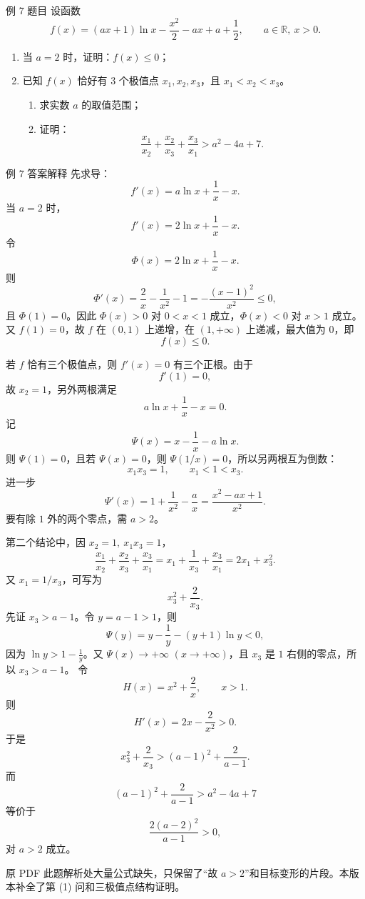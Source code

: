 ﻿\documentclass[aspectratio=169,10pt]{ctexbeamer}
\newcommand{\R}{\mathbb R}
\newcommand{\auditnote}[1]{\par\medskip{\color{Warn}\bfseries 原答案疏漏/补充：}#1}
\begin{document}
\begin{frame}{例 7 题目}
\small
设函数
\[
f(x)=(ax+1)\ln x-\frac{x^2}{2}-ax+a+\frac12,\qquad a\in\R,\ x>0.
\]
\begin{enumerate}
  \item 当 $a=2$ 时，证明：$f(x)\le0$；
  \item 已知 $f(x)$ 恰好有 $3$ 个极值点 $x_1,x_2,x_3$，且 $x_1<x_2<x_3$。
  \begin{enumerate}
    \item 求实数 $a$ 的取值范围；
    \item 证明：
    \[
    \frac{x_1}{x_2}+\frac{x_2}{x_3}+\frac{x_3}{x_1}>a^2-4a+7.
    \]
  \end{enumerate}
\end{enumerate}
\end{frame}

\begin{frame}[allowframebreaks]{例 7 答案解释}
\small
先求导：
\[
f'(x)=a\ln x+\frac1x-x.
\]
当 $a=2$ 时，
\[
f'(x)=2\ln x+\frac1x-x.
\]
令
\[
\Phi(x)=2\ln x+\frac1x-x.
\]
则
\[
\Phi'(x)=\frac2x-\frac1{x^2}-1=-\frac{(x-1)^2}{x^2}\le0,
\]
且 $\Phi(1)=0$。因此 $\Phi(x)>0$ 对 $0<x<1$ 成立，$\Phi(x)<0$ 对 $x>1$ 成立。
又 $f(1)=0$，故 $f$ 在 $(0,1)$ 上递增，在 $(1,+\infty)$ 上递减，最大值为 $0$，即
\[
f(x)\le0.
\]

\framebreak

若 $f$ 恰有三个极值点，则 $f'(x)=0$ 有三个正根。由于
\[
f'(1)=0,
\]
故 $x_2=1$，另外两根满足
\[
a\ln x+\frac1x-x=0.
\]
记
\[
\Psi(x)=x-\frac1x-a\ln x.
\]
则 $\Psi(1)=0$，且若 $\Psi(x)=0$，则 $\Psi(1/x)=0$，所以另两根互为倒数：
\[
x_1x_3=1,\qquad x_1<1<x_3.
\]
进一步
\[
\Psi'(x)=1+\frac1{x^2}-\frac ax=\frac{x^2-ax+1}{x^2}.
\]
要有除 $1$ 外的两个零点，需 $a>2$。

\framebreak

第二个结论中，因 $x_2=1,\ x_1x_3=1$，
\[
\frac{x_1}{x_2}+\frac{x_2}{x_3}+\frac{x_3}{x_1}
=x_1+\frac1{x_3}+\frac{x_3}{x_1}
=2x_1+x_3^2.
\]
又 $x_1=1/x_3$，可写为
\[
x_3^2+\frac2{x_3}.
\]
先证 $x_3>a-1$。令 $y=a-1>1$，则
\[
\Psi(y)=y-\frac1y-(y+1)\ln y<0,
\]
因为 $\ln y>1-\frac1y$。又 $\Psi(x)\to+\infty$ $(x\to+\infty)$，且 $x_3$ 是 $1$ 右侧的零点，所以 $x_3>a-1$。
令
\[
H(x)=x^2+\frac2x,\qquad x>1.
\]
则
\[
H'(x)=2x-\frac2{x^2}>0.
\]
于是
\[
x_3^2+\frac2{x_3}>(a-1)^2+\frac2{a-1}.
\]
而
\[
(a-1)^2+\frac2{a-1}>a^2-4a+7
\]
等价于
\[
\frac{2(a-2)^2}{a-1}>0,
\]
对 $a>2$ 成立。

\auditnote{原 PDF 此题解析处大量公式缺失，只保留了“故 $a>2$”和目标变形的片段。本版本补全了第 (1) 问和三极值点结构证明。}
\end{frame}
\end{document}
